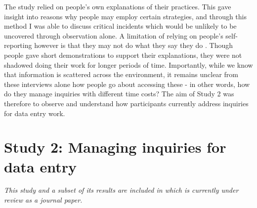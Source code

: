 The study relied on people's own explanations of their practices. This gave insight into reasons why people may employ certain strategies, and through this method I was able to discuss critical incidents which would be unlikely to be uncovered through observation alone. A limitation of relying on people's self-reporting however is that they may not do what they say they do \citep[e.g.][]{Randall2014}. Though people gave short demonstrations to support their explanations, they were not shadowed doing their work for longer periods of time. Importantly, while we know that information is scattered across the environment, it remains unclear from these interviews alone how people go about accessing these - in other words, how do they manage inquiries with different time costs? The aim of Study 2 was therefore to observe and understand how participants currently address inquiries for data entry work.


\section{Study 2: Managing inquiries for data entry}\label{st:Study2}

\textit{This study and a subset of its results are included in \citet{Borghouts2018} which is currently under review as a journal paper.}

